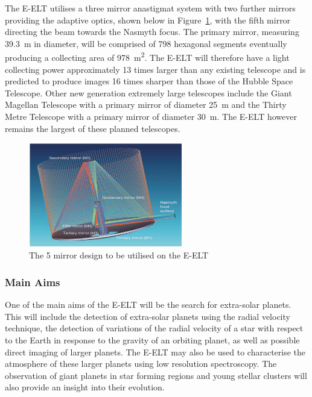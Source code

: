 	The E-ELT utilises a three mirror anastigmat system with two further mirrors providing the adaptive optics, shown below in Figure~\ref{fig:5_mirror_eelt}, with the fifth mirror directing the beam towards the Nasmyth focus\cite[p.~16]{E_ELT_Construction_Proposal}. The primary mirror, measuring \SI{39.3}{\metre} in diameter, will be comprised of 798 hexagonal segments eventually producing a collecting area of \SI{978}{\square\metre}. The E-ELT will therefore have a light collecting power approximately 13 times larger than any existing telescope and is predicted to produce images 16 times sharper than those of the Hubble Space Telescope. Other new generation extremely large telescopes include the Giant Magellan Telescope with a primary mirror of diameter \SI{25}{\metre} and the Thirty Metre Telescope with a primary mirror of diameter \SI{30}{\metre}. The E-ELT however remains the largest of these planned telescopes.
	\begin{figure}[htbp]
		\centering
		\includegraphics[width=0.6\textwidth]{../Images/Anastigmat.png}
		\caption{The 5 mirror design to be utilised on the E-ELT}\label{fig:5_mirror_eelt}
	\end{figure}

	\subsubsection{Main Aims} %
	\label{ssub:main_aims}
		One of the main aims of the E-ELT will be the search for extra-solar planets.  This will include the detection of extra-solar planets using the radial velocity technique, the detection of variations of the radial velocity of a star with respect to the Earth in response to the gravity of an orbiting planet, as well as possible direct imaging of larger planets. The E-ELT may also be used to characterise the atmosphere of these larger planets using low resolution spectroscopy. The observation of giant planets in star forming regions and young stellar clusters will also provide an insight into their evolution.


